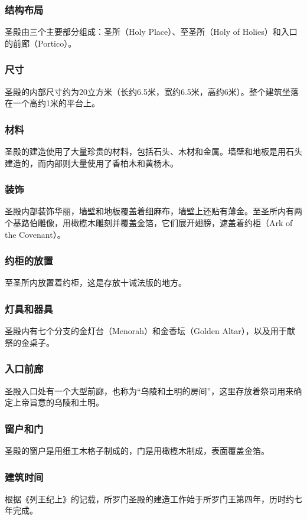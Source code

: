 \documentclass[12pt, a4paper]{ctexart}
\begin{document}
\subsubsection{结构布局}
圣殿由三个主要部分组成：圣所（Holy Place）、至圣所（Holy of Holies）和入口的前廊（Portico）。

\subsubsection{尺寸}
圣殿的内部尺寸约为20立方米（长约6.5米，宽约6.5米，高约6米）。整个建筑坐落在一个高约1米的平台上。

\subsubsection{材料}
圣殿的建造使用了大量珍贵的材料，包括石头、木材和金属。墙壁和地板是用石头建造的，而内部则大量使用了香柏木和黄杨木。

\subsubsection{装饰}
圣殿内部装饰华丽，墙壁和地板覆盖着细麻布，墙壁上还贴有薄金。至圣所内有两个基路伯雕像，用橄榄木雕刻并覆盖金箔，它们展开翅膀，遮盖着约柜（Ark of the Covenant）。

\subsubsection{约柜的放置}
至圣所内放置着约柜，这是存放十诫法版的地方。

\subsubsection{灯具和器具}
圣殿内有七个分支的金灯台（Menorah）和金香坛（Golden Altar），以及用于献祭的金桌子。

\subsubsection{入口前廊}
圣殿入口处有一个大型前廊，也称为“乌陵和土明的房间”，这里存放着祭司用来确定上帝旨意的乌陵和土明。

\subsubsection{窗户和门}
圣殿的窗户是用细工木格子制成的，门是用橄榄木制成，表面覆盖金箔。

\subsubsection{建筑时间}
根据《列王纪上》的记载，所罗门圣殿的建造工作始于所罗门王第四年，历时约七年完成。
\end{document}
